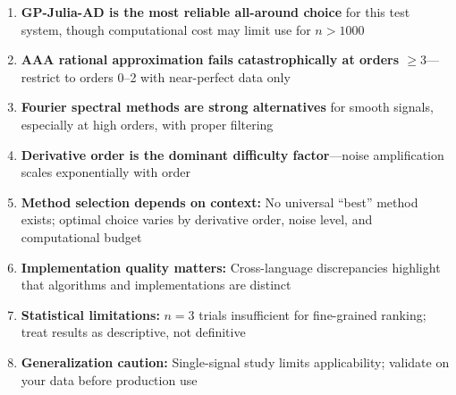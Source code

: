 \begin{enumerate}
    \item \textbf{GP-Julia-AD is the most reliable all-around choice} for this test system, though computational cost may limit use for $n > 1000$

    \item \textbf{AAA rational approximation fails catastrophically at orders $\geq 3$}---restrict to orders 0--2 with near-perfect data only

    \item \textbf{Fourier spectral methods are strong alternatives} for smooth signals, especially at high orders, with proper filtering

    \item \textbf{Derivative order is the dominant difficulty factor}---noise amplification scales exponentially with order

    \item \textbf{Method selection depends on context:} No universal ``best'' method exists; optimal choice varies by derivative order, noise level, and computational budget

    \item \textbf{Implementation quality matters:} Cross-language discrepancies highlight that algorithms and implementations are distinct

    \item \textbf{Statistical limitations:} $n=3$ trials insufficient for fine-grained ranking; treat results as descriptive, not definitive

    \item \textbf{Generalization caution:} Single-signal study limits applicability; validate on your data before production use
\end{enumerate}
